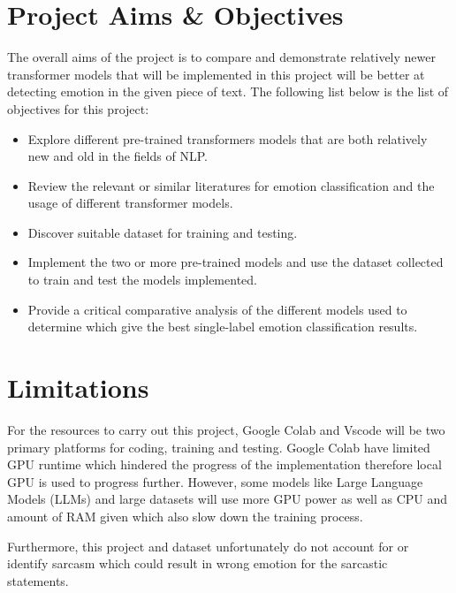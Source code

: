 \section{Project Aims \& Objectives}
The overall aims of the project is to compare and demonstrate relatively newer transformer models that will be implemented in this project will be better at detecting emotion in the given piece of text. The following list below is the list of objectives for this project:

\begin{itemize}
    \item Explore different pre-trained transformers models that are both relatively new and old in the fields of NLP.
    \item Review the relevant or similar literatures for emotion classification and the usage of different transformer models.
    \item Discover suitable dataset for training and testing.
    \item Implement the two or more pre-trained models and use the dataset collected to train and test the models implemented.
    \item Provide a critical comparative analysis of the different models used to determine which give the best single-label emotion classification results.
\end{itemize}

\section{Limitations}

For the resources to carry out this project, Google Colab and Vscode will be two primary platforms for coding, training and testing.
Google Colab have limited GPU runtime which hindered the progress of the implementation therefore local GPU is used to progress further.
However, some models like Large Language Models (LLMs) and large datasets will use more GPU power as well as CPU and amount of RAM given which also slow down the training process.

Furthermore, this project and dataset unfortunately do not account for or identify sarcasm which could result in wrong emotion for the sarcastic statements.
